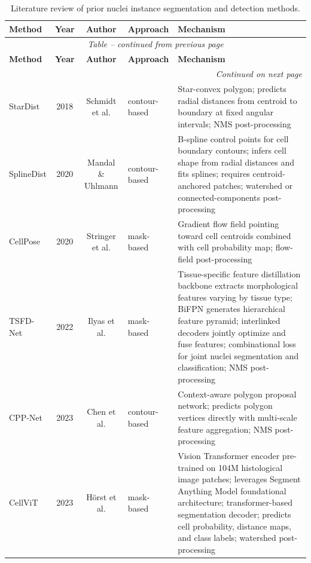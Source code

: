 \begin{longtable}{l c c l >{\footnotesize}p{}}
	\caption{Literature review of prior nuclei instance segmentation and detection methods.}
	\label{tab:literature-review} \\
	\hline
	\textbf{Method} & \textbf{Year} & \textbf{Author} & \textbf{Approach} & \textbf{Mechanism} \\
	\hline
	\endfirsthead
	\multicolumn{5}{c}{\textit{Table \thetable{} -- continued from previous page}} \\
	\hline
	\textbf{Method} & \textbf{Year} & \textbf{Author} & \textbf{Approach} & \textbf{Mechanism} \\
	\hline
	\endhead
	\hline
	\multicolumn{5}{r}{\textit{Continued on next page}} \\
	\endfoot
	\hline
	\endlastfoot
		StarDist \cite{schmidt2018cell, weigert2022stardist}
			& 2018 & Schmidt et al.
			& contour-based
			& Star-convex polygon; predicts radial distances from centroid to boundary at fixed angular intervals; NMS post-processing \\
		SplineDist \cite{mandal2020splinedist}
			& 2020 & Mandal \& Uhlmann
			& contour-based
			& B-spline control points for cell boundary contours; infers cell shape from radial distances and fits splines; requires centroid-anchored patches; watershed or connected-components post-processing \\
		CellPose \cite{stringer2020cellpose, stringer2025cellposesam}
			& 2020 & Stringer et al.
			& mask-based
			& Gradient flow field pointing toward cell centroids combined with cell probability map; flow-field post-processing \\
		TSFD-Net \cite{ilyas2022tsfd}
			& 2022 & Ilyas et al.
			& mask-based
			& Tissue-specific feature distillation backbone extracts morphological features varying by tissue type; BiFPN generates hierarchical feature pyramid; interlinked decoders jointly optimize and fuse features; combinational loss for joint nuclei segmentation and classification; NMS post-processing \\
		CPP-Net \cite{chen2023cppnet}
			& 2023 & Chen et al.
			& contour-based
			& Context-aware polygon proposal network; predicts polygon vertices directly with multi-scale feature aggregation; NMS post-processing \\
		CellViT \cite{horst2023cellvit}
			& 2023 & Hörst et al.
			& mask-based
			& Vision Transformer encoder pre-trained on 104M histological image patches; leverages Segment Anything Model foundational architecture; transformer-based segmentation decoder; predicts cell probability, distance maps, and class labels; watershed post-processing \\

\end{longtable}
